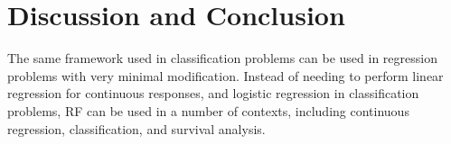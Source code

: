 \documentclass[11pt]{article}
\begin{document}
\section*{Discussion and Conclusion}
The same framework used in classification problems can be used in regression problems with very minimal modification. Instead of needing to perform linear regression for continuous responses, and logistic regression in classification problems, RF can be used in a number of contexts, including continuous regression, classification, and survival analysis.

\nocite{*}


\end{document}

